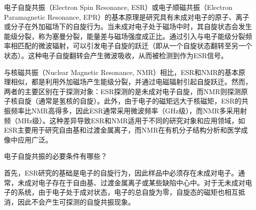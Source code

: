 \documentclass[dvipsnames, svgnames,a4paper,11pt]{article}
\begin{document}
电子自旋共振（Electron Spin Resonance, ESR）或电子顺磁共振（Electron Paramagnetic Resonance, EPR）的基本原理是研究具有未成对电子的原子、离子或分子在外加磁场下的自旋行为。当未成对电子处于磁场中时，其自旋状态会发生能级分裂，称为塞曼分裂，能量差与磁场强度成正比。通过引入与电子能级分裂频率相匹配的微波辐射，可以引发电子自旋的跃迁（即从一个自旋状态翻转至另一个状态）。这种电子自旋翻转会产生微波吸收，从而被检测到作为ESR信号。

与核磁共振（Nuclear Magnetic Resonance, NMR）相比，ESR和NMR的基本原理相似，都是利用外加磁场产生能级分裂，并通过电磁辐射引起自旋跃迁。然而，两者的主要区别在于探测对象：ESR探测的是未成对电子自旋，而NMR则探测原子核自旋（通常是氢核的自旋）。此外，由于电子的磁矩远大于核磁矩，ESR的共振频率比NMR高得多，因此ESR通常采用微波频率（GHz级），而NMR多采用射频（MHz级）。这种差异导致ESR和NMR适用于不同的研究对象和应用领域，如ESR主要用于研究自由基和过渡金属离子，而NMR在有机分子结构分析和医学成像中应用广泛。




\begin{question}
	电子自旋共振的必要条件有哪些？
\end{question}




首先，ESR研究的基础是电子的自旋行为，因此样品中必须存在未成对电子。通常，未成对电子存在于自由基、过渡金属离子或某些缺陷中心中。对于无未成对电子的系统，由于电子处于成对状态，电子的总自旋为零，自旋态的磁矩也相互抵消，因此不会产生可探测的自旋共振现象。
\end{document}
